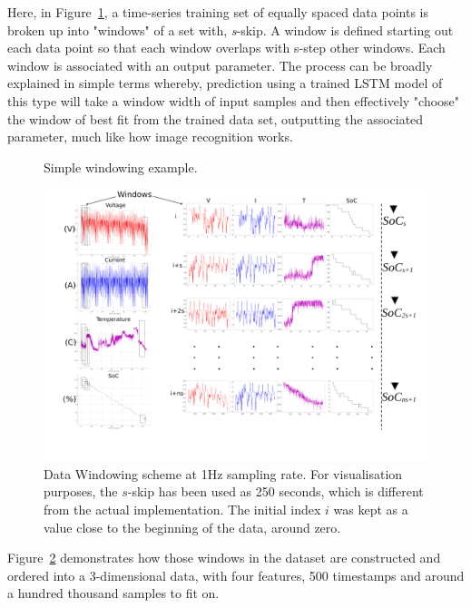 %
%
Here, in Figure~\ref{fig:windowing_simple}, a time-series training set of equally spaced data points is broken up into "windows" of a set with, \textit{s}-skip.
A window is defined starting out each data point so that each window overlaps with s-step other windows.
Each window is associated with an output parameter.
The process can be broadly explained in simple terms whereby, prediction using a trained LSTM model of this type will take a window width of input samples and then effectively "choose" the window of best fit from the trained data set, outputting the associated parameter, much like how image recognition works.
\begin{figure}[hbp]
    \centering
    
    \caption{Simple windowing example.}
    \label{fig:windowing_simple}
\end{figure}
\begin{landscape}
    \begin{figure}[t]
        \centering
        \includegraphics[width=1.05\linewidth]{II_Body/images/Windowing4f-A3.jpg}
        \caption{Data Windowing scheme at 1Hz sampling rate. For visualisation purposes, the $s$-skip has been used as 250 seconds, which is different from the actual implementation. The initial index $i$ was kept as a value close to the beginning of the data, around zero.}
        \label{fig:Windowing}
    \end{figure}
\end{landscape}
\mbox{Figure~\ref{fig:Windowing}} demonstrates how those windows in the dataset are constructed and ordered into a 3-dimensional data, with four features, 500 timestamps and around a hundred thousand samples to fit on.
